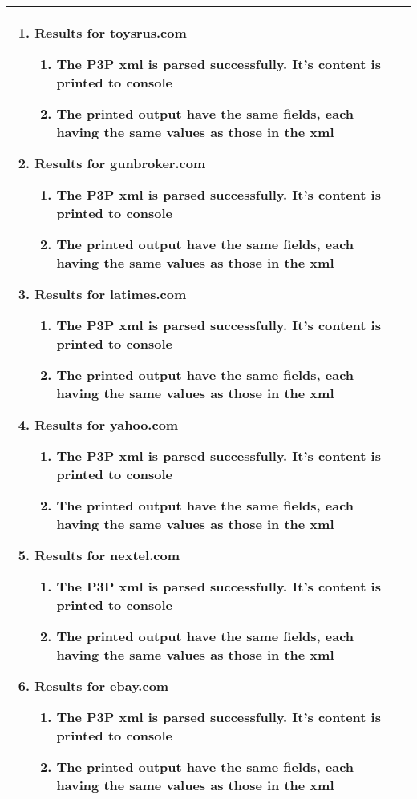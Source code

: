 \begin{center}
\begin{longtable}{ | p{4cm} | p{10cm} | }
\begin{enumerate}
							\item Results for toysrus.com
							\begin{enumerate}
								\item The P3P xml is parsed successfully. It's content is printed to console
								\item The printed output have the same fields, each having the same values as those in the xml
							\end{enumerate}
							
							\item Results for gunbroker.com
							\begin{enumerate}
								\item The P3P xml is parsed successfully. It's content is printed to console
								\item The printed output have the same fields, each having the same values as those in the xml
							\end{enumerate}

							\item Results for latimes.com
							\begin{enumerate}
								\item The P3P xml is parsed successfully. It's content is printed to console
								\item The printed output have the same fields, each having the same values as those in the xml
							\end{enumerate}

							\item Results for yahoo.com
							\begin{enumerate}
								\item The P3P xml is parsed successfully. It's content is printed to console
								\item The printed output have the same fields, each having the same values as those in the xml
							\end{enumerate}

							\item Results for nextel.com
							\begin{enumerate}
								\item The P3P xml is parsed successfully. It's content is printed to console
								\item The printed output have the same fields, each having the same values as those in the xml
							\end{enumerate}
					
							\item Results for ebay.com
							\begin{enumerate}
								\item The P3P xml is parsed successfully. It's content is printed to console
								\item The printed output have the same fields, each having the same values as those in the xml
							\end{enumerate}
						\end{enumerate}
							 \\  [3pt] \hline


\end{longtable}
\end{center}
